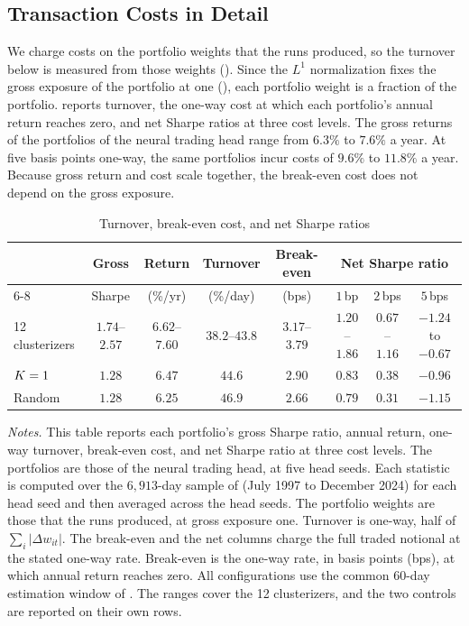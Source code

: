 \subsection{Transaction Costs in Detail}
\label{app:costs}

We charge costs on the portfolio weights that the runs produced, so the turnover below is measured from those weights (). Since the $L^1$ normalization fixes the gross exposure of the portfolio at one (), each portfolio weight is a fraction of the portfolio.  reports turnover, the one-way cost at which each portfolio's annual return reaches zero, and net Sharpe ratios at three cost levels. The gross returns of the portfolios of the neural trading head range from $6.3\%$ to $7.6\%$ a year. At five basis points one-way, the same portfolios incur costs of $9.6\%$ to $11.8\%$ a year. Because gross return and cost scale together, the break-even cost does not depend on the gross exposure.

\begin{table}[tb]
\centering
\caption{Turnover, break-even cost, and net Sharpe ratios}
\label{tab:costs}
\begin{threeparttable}
\small
\setlength{\tabcolsep}{4pt}
\begin{tabular}{@{}lccccccc@{}}
\toprule
& Gross & Return & Turnover & Break-even
& \multicolumn{3}{c}{Net Sharpe ratio} \\
\cmidrule(lr){6-8}
& Sharpe & (\%/yr) & (\%/day) & (bps)
& $1$\,bp & $2$\,bps & $5$\,bps \\
\midrule
12 clusterizers & $1.74$--$2.57$ & $6.62$--$7.60$ & $38.2$--$43.8$ & $3.17$--$3.79$ & $1.20$--$1.86$ & $0.67$--$1.16$ & $-1.24$ to $-0.67$ \\
$K=1$ & $1.28$ & $6.47$ & $44.6$ & $2.90$ & $0.83$ & $0.38$ & $-0.96$ \\
Random & $1.28$ & $6.25$ & $46.9$ & $2.66$ & $0.79$ & $0.31$ & $-1.15$ \\
\bottomrule
\end{tabular}
\begin{tablenotes}[flushleft]\small
\item \emph{Notes.} This table reports each portfolio's gross Sharpe ratio, annual return, one-way turnover, break-even cost, and net Sharpe ratio at three cost levels. The portfolios are those of the neural trading head, at five head seeds. Each statistic is computed over the $6{,}913$-day sample of  (July 1997 to December 2024) for each head seed and then averaged across the head seeds. The portfolio weights are those that the runs produced, at gross exposure one. Turnover is one-way, half of
$\sum_i |\Delta w_{it}|$. The break-even and the net columns charge the
full traded notional at the stated one-way rate. Break-even is the one-way rate, in basis points (bps), at which annual return reaches zero. All configurations use the common 60-day estimation window of . The ranges cover the 12 clusterizers, and the two controls are reported on their own rows.
\end{tablenotes}
\end{threeparttable}
\end{table}

